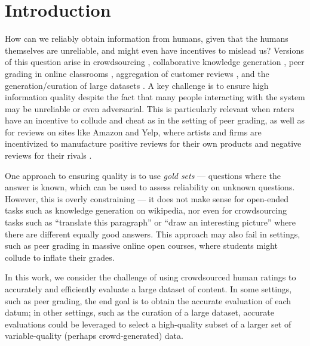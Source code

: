 \section{Introduction}
\label{sec:intro}


How can we reliably obtain information from humans, given that the humans 
themselves are unreliable, and might even have incentives to mislead us?
Versions of this question arise in crowdsourcing , 
collaborative knowledge generation , peer grading 
in online classrooms ,  aggregation 
of customer reviews , and the generation/curation of large datasets . A key challenge is to ensure 
high information quality despite the fact that many people interacting with 
the system may be unreliable or even adversarial.
This is particularly relevant when raters have an incentive to collude and 
cheat as in the setting of peer grading, as well as for reviews on sites like 
Amazon and Yelp, 
where artists and firms are incentivized to manufacture positive reviews 
for their own products and negative reviews for their rivals .

One approach to ensuring quality is to use \emph{gold sets} --- questions where 
the answer is known, which can be used to assess reliability on unknown questions. 
However, this is overly constraining --- it does not make sense for open-ended 
tasks such as knowledge generation on wikipedia, nor even for crowdsourcing 
tasks such as ``translate this paragraph'' or ``draw an interesting picture'' 
where there are different equally good answers.   This approach may also fail 
in settings, such as %
peer grading in massive online open courses, where 
students might collude to inflate their grades.

In this work, we consider the challenge of using crowdsourced human ratings to accurately and efficiently evaluate a large dataset of content.   In some settings, such as peer grading, the end goal is to obtain the accurate evaluation of each datum; in other settings, such as the curation of a large dataset, accurate evaluations could be leveraged to select a high-quality subset of a larger set of variable-quality (perhaps crowd-generated) data.  

